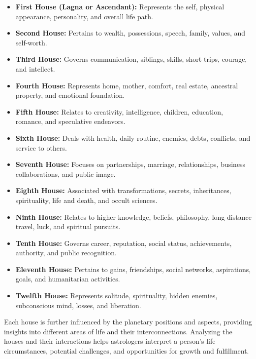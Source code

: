 \begin{itemize}
	\item \textbf{First House (Lagna or Ascendant):} Represents the self, physical appearance, personality, and overall life path.
	\item \textbf{Second House:} Pertains to wealth, possessions, speech, family, values, and self-worth.
	\item \textbf{Third House:} Governs communication, siblings, skills, short trips, courage, and intellect.
	\item \textbf{Fourth House:} Represents home, mother, comfort, real estate, ancestral property, and emotional foundation.
	\item \textbf{Fifth House:} Relates to creativity, intelligence, children, education, romance, and speculative endeavors.
	\item \textbf{Sixth House:} Deals with health, daily routine, enemies, debts, conflicts, and service to others.
	\item \textbf{Seventh House:} Focuses on partnerships, marriage, relationships, business collaborations, and public image.
	\item \textbf{Eighth House:} Associated with transformations, secrets, inheritances, spirituality, life and death, and occult sciences.
	\item \textbf{Ninth House:} Relates to higher knowledge, beliefs, philosophy, long-distance travel, luck, and spiritual pursuits.
	\item \textbf{Tenth House:} Governs career, reputation, social status, achievements, authority, and public recognition.
	\item \textbf{Eleventh House:} Pertains to gains, friendships, social networks, aspirations, goals, and humanitarian activities.
	\item \textbf{Twelfth House:} Represents solitude, spirituality, hidden enemies, subconscious mind, losses, and liberation.
\end{itemize}

Each house is further influenced by the planetary positions and aspects, providing insights into different areas of life and their interconnections. Analyzing the houses and their interactions helps astrologers interpret a person's life circumstances, potential challenges, and opportunities for growth and fulfillment.

